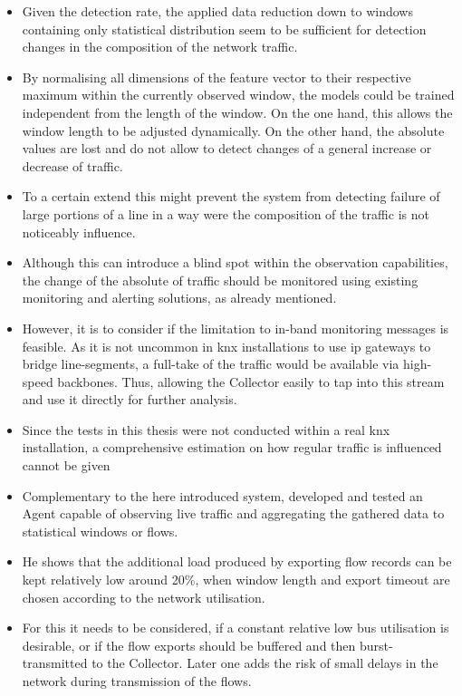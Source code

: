 \begin{itemize}
	\item Given the detection rate, the applied data reduction down to windows containing only statistical distribution seem to be sufficient for detection changes in the composition of the network traffic.
	\item By normalising all dimensions of the feature vector to their respective maximum within the currently observed window, the models could be trained independent from the length of the window. On the one hand, this allows the window length to be adjusted dynamically.
	On the other hand, the absolute values are lost and do not allow to detect changes of a general increase or decrease of traffic. 
	\item To a certain extend this might prevent the system from detecting failure of large portions of a line in a way were the composition of the traffic is not noticeably influence.
	\item Although this can introduce a blind spot within the observation capabilities, the change of the absolute of traffic should be monitored using existing monitoring and alerting solutions, as already mentioned.
	
	\item However, it is to consider if the limitation to in-band monitoring messages is feasible. As it is not uncommon in \gls{knx} installations to use \gls{ip} gateways to bridge line-segments, a full-take of the traffic would be available via high-speed backbones. Thus, allowing the Collector easily to tap into this stream and use it directly for further analysis.
	
	\item Since the tests in this thesis were not conducted within a real \gls{knx} installation, a comprehensive estimation on how regular traffic is influenced cannot be given
	\item Complementary to the here introduced system, \textcite{Jung2018} developed and tested an Agent capable of observing live traffic and aggregating the gathered data to statistical windows or flows.
	\item He shows that the additional load produced by exporting flow records can be kept relatively low around 20\%, when window length and export timeout are chosen according to the network utilisation.
	\item For this it needs to be considered, if a constant relative low bus utilisation is desirable, or if the flow exports should be buffered and then burst-transmitted to the Collector. Later one adds the risk of small delays in the network during transmission of the flows.
	

\end{itemize}
